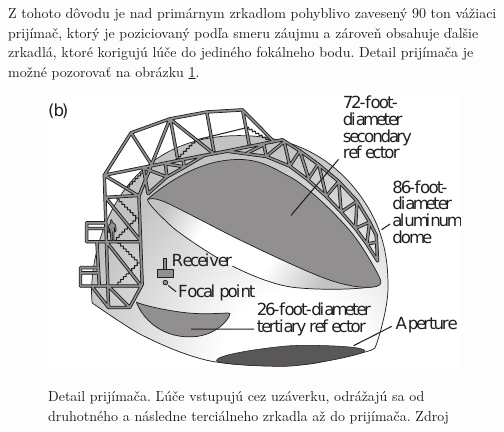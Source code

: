 Z tohoto dôvodu je nad primárnym zrkadlom pohyblivo zavesený 90 ton vážiaci prijímač, ktorý je poziciovaný
podľa smeru záujmu a zároveň obsahuje ďalšie zrkadlá, ktoré korigujú lúče do jediného fokálneho
bodu\cite{hechtoptics}. Detail prijímača je možné pozorovať na obrázku \ref{areciboReceiver}.

\begin{figure}
\includegraphics[scale=0.9]{obrazky-figures/areciboReceiver.pdf}
    \label{areciboReceiver}
    \centering \caption{Detail prijímača. Ľúče vstupujú cez uzáverku, odrážajú sa od druhotného a
    následne terciálneho zrkadla až do prijímača. Zdroj\cite{hechtoptics}}
\end{figure}

